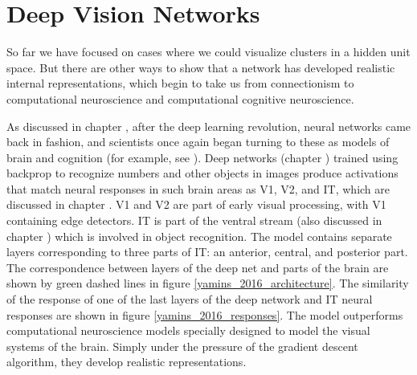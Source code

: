 \section{Deep Vision Networks}

So far we have focused on cases where we could visualize clusters in a hidden unit space. But there are other ways to show that a network has developed realistic internal representations, which begin to take us from connectionism to computational neuroscience and computational cognitive neuroscience.

As discussed in chapter , after the deep learning revolution, neural networks came back in fashion, and scientists once again began turning to these as models of brain and cognition (for example, see  \cite{yamins2014performance, yamins2016using}). Deep networks (chapter ) trained using backprop to recognize numbers and other objects in images produce activations that match neural responses in such brain areas as V1, V2, and IT, which are discussed in chapter .  V1 and V2 are part of early visual processing, with V1 containing edge detectors. IT is part of the ventral stream (also discussed in chapter ) which is involved in object recognition. The model contains separate layers corresponding to three parts of IT: an anterior, central, and posterior part. The correspondence between layers of the deep net and parts of the brain are shown by green dashed lines in figure \ref{yamins_2016_architecture}.  The similarity of the response of one of the last layers of the deep network and IT neural responses are shown in figure \ref{yamins_2016_responses}.  The model outperforms computational neuroscience models specially designed to model the visual systems of the brain. Simply under the pressure of the gradient descent algorithm, they develop realistic representations. 

